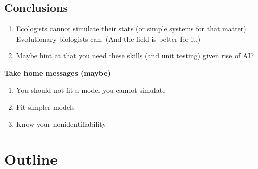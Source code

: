 \documentclass[11pt]{article}
\begin{document}
\subsection{Conclusions}
\begin{enumerate}
\item Ecologists cannot simulate their stats (or simple systems for that matter). Evolutionary biologists can. (And the field is better for it.)
\item Maybe hint at that you need these skills (and unit testing) given rise of AI?
\end{enumerate}

{\bf Take home messages (maybe)}
\begin{enumerate}
\item You should not fit a model you cannot simulate
\item Fit simpler models
\item Know your nonidentifiability
\end{enumerate}

\section{Outline}
\end{document}
